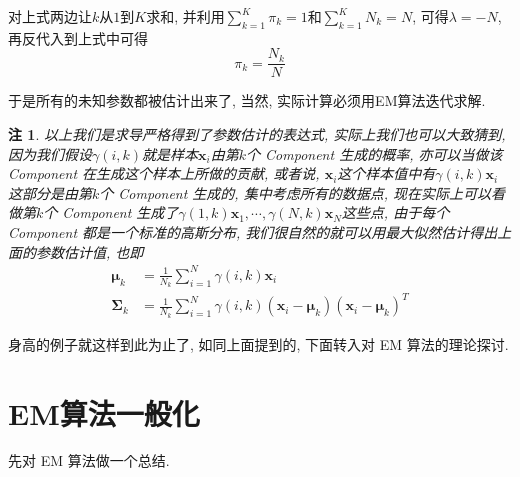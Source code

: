 \documentclass[a4paper,UTF8]{ctexart}
\theoremstyle{plain} \newtheorem{theorem}{定理}[section]
\theoremstyle{plain} \newtheorem{definition}{定义}[section]
\theoremstyle{plain} \newtheorem{lemma}{引理}[section]
\theoremstyle{plain} \newtheorem{proposition}{命题}[section]
\theoremstyle{plain} \newtheorem{example}{例}
\theoremstyle{plain} \newtheorem{remark}{注}
\theoremstyle{plain} \newtheorem{corollary}{推论}[section]
\begin{document}
对上式两边让$k$从$1$到$K$求和, 并利用$\sum\limits_{k=1}^{K} \pi_{k} = 1$和$\sum\limits_{k=1}^{K} N_{k} = N$, 可得$\lambda = - N$,再反代入到上式中可得
\begin{equation*}
\pi_{k} = \frac{N_{k}}{N}
\end{equation*}

于是所有的未知参数都被估计出来了, 当然, 实际计算必须用EM算法迭代求解.

\begin{remark}
以上我们是求导严格得到了参数估计的表达式, 实际上我们也可以大致猜到, 因为我们假设$\gamma(i, k)$就是样本$\bm{x}_{i}$由第$k$个 Component 生成的概率, 亦可以当做该 Component 在生成这个样本上所做的贡献, 或者说, $\bm{x}_{i}$这个样本值中有$\gamma(i, k) \bm{x}_{i}$这部分是由第$k$个 Component 生成的, 集中考虑所有的数据点, 现在实际上可以看做第$k$个 Component 生成了$\gamma(1, k) \bm{x}_{1}, \cdots, \gamma(N, k) \bm{x}_{N}$这些点, 由于每个 Component 都是一个标准的高斯分布, 我们很自然的就可以用最大似然估计得出上面的参数估计值, 也即
\begin{align*}
\bm{\mu}_{k} & = \frac{1}{N_{k}} \sum_{i=1}^{N} \gamma(i,k) \bm{x}_{i} \\ 
\bm{\Sigma}_{k} & = \frac{1}{N_{k}} \sum_{i=1}^{N} \gamma(i,k) (\bm{x}_{i} - \bm{\mu}_{k}) (\bm{x}_{i} - \bm{\mu}_{k})^{T}
\end{align*}

\end{remark}


身高的例子就这样到此为止了, 如同上面提到的, 下面转入对 EM 算法的理论探讨.


\section{EM算法一般化}
先对 EM 算法做一个总结.
\end{document}
